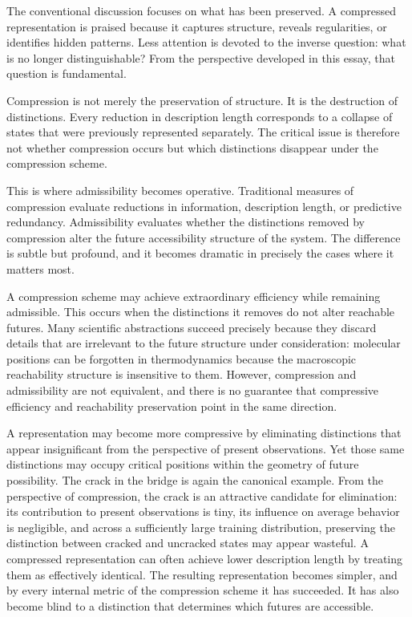 \documentclass[12pt,a4paper]{article}
\theoremstyle{plain}
\theoremstyle{definition}
\theoremstyle{remark}
\begin{document}
The conventional discussion focuses on what has been preserved. A compressed
representation is praised because it captures structure, reveals regularities,
or identifies hidden patterns. Less attention is devoted to the inverse
question: what is no longer distinguishable? From the perspective developed
in this essay, that question is fundamental.

Compression is not merely the preservation of structure. It is the destruction
of distinctions. Every reduction in description length corresponds to a
collapse of states that were previously represented separately. The critical
issue is therefore not whether compression occurs but which distinctions
disappear under the compression scheme.

This is where admissibility becomes operative. Traditional measures of
compression evaluate reductions in information, description length, or
predictive redundancy. Admissibility evaluates whether the distinctions
removed by compression alter the future accessibility structure of the
system. The difference is subtle but profound, and it becomes dramatic in
precisely the cases where it matters most.

A compression scheme may achieve extraordinary efficiency while remaining
admissible. This occurs when the distinctions it removes do not alter
reachable futures. Many scientific abstractions succeed precisely because they
discard details that are irrelevant to the future structure under
consideration: molecular positions can be forgotten in thermodynamics because
the macroscopic reachability structure is insensitive to them. However,
compression and admissibility are not equivalent, and there is no guarantee
that compressive efficiency and reachability preservation point in the same
direction.

A representation may become more compressive by eliminating distinctions that
appear insignificant from the perspective of present observations. Yet those
same distinctions may occupy critical positions within the geometry of future
possibility. The crack in the bridge is again the canonical example.
From the perspective of compression, the crack is an attractive candidate for
elimination: its contribution to present observations is tiny, its influence
on average behavior is negligible, and across a sufficiently large training
distribution, preserving the distinction between cracked and uncracked states
may appear wasteful. A compressed representation can often achieve lower
description length by treating them as effectively identical. The resulting
representation becomes simpler, and by every internal metric of the
compression scheme it has succeeded. It has also become blind to a
distinction that determines which futures are accessible.
\end{document}
